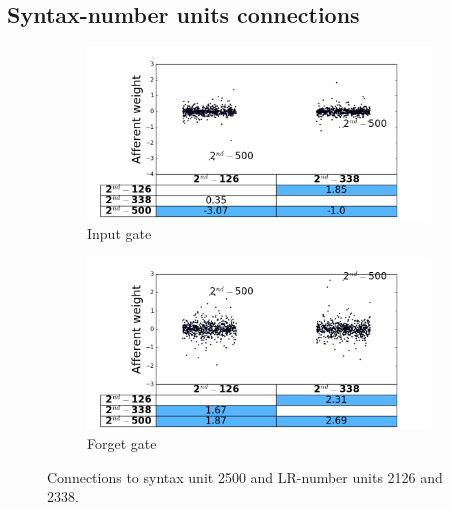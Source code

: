 \subsection{Syntax-number units connections}

\begin{figure}[t]
    \centering
    \begin{subfigure}{0.49\textwidth}
            \centering
            \includegraphics[width=\textwidth]{Figures/gate_Input_afferent_interactions.png}
            \caption{Input gate}
            \label{fig:interaction-input}
    \end{subfigure}
    \begin{subfigure}{0.49\textwidth}
           \centering
          \includegraphics[width=\textwidth]{Figures/gate_Forget_afferent_interactions.png}
          \caption{Forget gate}
          \label{fig:interaction-forget}
    \end{subfigure}
\caption{Connections to syntax unit \unit{2}{500} and LR-number units \unit{2}{126} and \unit{2}{338}. }
\label{fig:interaction}
\end{figure}

